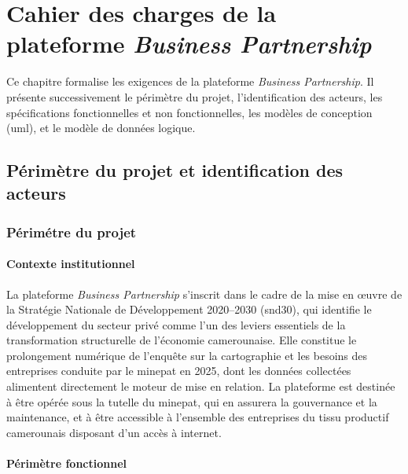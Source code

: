 \documentclass[12pt, a4paper, oneside]{report}
\begin{document}
	\chapter{Cahier des charges de la plateforme
		\textit{Business Partnership}}
	\label{chap:cahier_charges}
	
Ce chapitre formalise les exigences de la plateforme
\textit{Business Partnership}. Il pr\'esente successivement le
p\'erim\`etre du projet, l'identification des acteurs, les
sp\'ecifications fonctionnelles et non fonctionnelles, les mod\`eles
de conception (\gls{uml}), et le mod\`ele de donn\'ees logique.
	
	\section{Périmètre du projet et identification des acteurs}
	\label{sec:contexte_projet}
	\subsection{Périmétre du projet}
	\subsubsection{Contexte institutionnel}
	
	La plateforme \textit{Business Partnership} s'inscrit dans le cadre
	de la mise en \oe uvre de la Stratégie Nationale de Développement
	2020--2030 (\gls{snd30}), qui identifie le développement du secteur
	privé comme l'un des leviers essentiels de la transformation
	structurelle de l'économie camerounaise. Elle constitue le
	prolongement numérique de l'enquête sur la cartographie et les
	besoins des entreprises conduite par le \gls{minepat} en 2025,
	dont les données collectées alimentent directement le moteur de mise en relation. La plateforme est
	destinée à être opérée sous la tutelle du \gls{minepat}, qui
	en assurera la gouvernance et la maintenance, et à être accessible
	à l'ensemble des entreprises du tissu productif camerounais
	disposant d'un accès à internet.
	
	\subsubsection{Périmètre fonctionnel}
	
\end{document}
